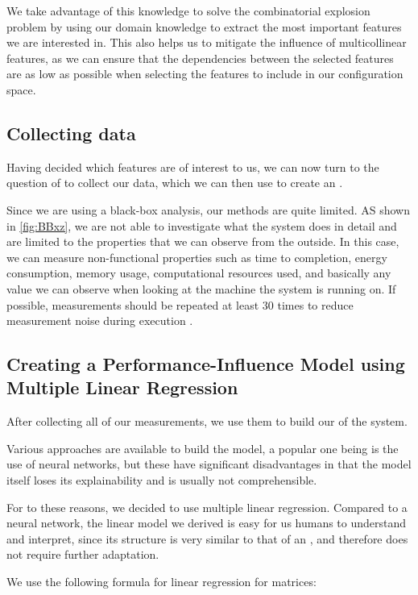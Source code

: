 We take advantage of this knowledge to solve the combinatorial explosion problem by using our domain knowledge to extract the most important
features we are interested in. This also helps us to mitigate the influence of multicollinear features, as we can ensure that the dependencies 
between the selected features are as low as possible when selecting the features to include in our configuration space.

\subsection{Collecting data}
Having decided which features are of interest to us, we can now turn to the question of to collect our data,
which we can then use to create an \perfInfluenceModel.

Since we are using a black-box analysis, our methods are quite limited. AS shown in \autoref{fig:BBxz}, we are not able to investigate what the system does 
in detail and are limited to the properties that we can observe from the outside. 
In this case, we can measure non-functional properties such as time to completion, energy consumption, memory usage, 
computational resources used, and basically any value we can observe when looking at the machine the system is running on. 
If possible, measurements should be repeated at least 30 times to reduce measurement noise during execution \cite{SampleSize}.


\subsection{Creating a Performance-Influence Model using Multiple Linear Regression}
After collecting all of our measurements, we use them to build our \perfInfluenceModel of the system. 

Various approaches are available to build the model, 
 a popular one being is the use of neural networks, but these have significant disadvantages in that the model itself 
loses its explainability and is usually not comprehensible. 

For to these reasons, we decided to use multiple linear regression. Compared to a neural network, the linear model we 
derived is easy for us humans to understand and interpret, since its structure is very similar to that of an \perfInfluenceModel,
and therefore does not require further adaptation.

We use the following formula for linear regression for matrices\cite{Linear-Regression-Performance}:

